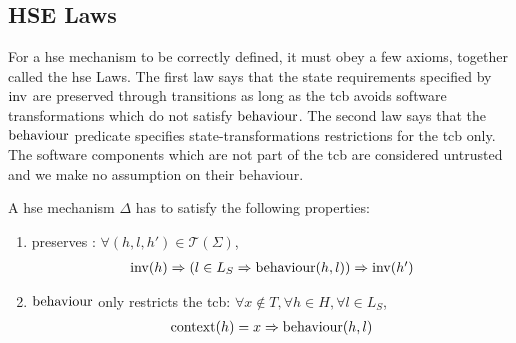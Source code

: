 \subsection{HSE Laws}
\label{subsec:speccert:laws}

For a \ac{hse} mechanism to be correctly defined, it must obey a few axioms,
together called the \ac{hse} Laws.
%
The first law says that the state requirements specified by $\mathrm{inv}$ are
preserved through transitions as long as the \ac{tcb} avoids software
transformations which do not satisfy $\mathrm{behaviour}$.
%
The second law says that the $\mathrm{behaviour}$ predicate specifies
state-transformations restrictions for the \ac{tcb} only.
%
The software components which are not part of the \ac{tcb} are considered
untrusted and we make no assumption on their behaviour.

\begin{definition}
  \label{def:laws}
  A \ac{hse} mechanism $\Delta$ has to satisfy the following properties:
  \begin{enumerate}
  \item {} preserves :
    $\forall (h, l, h') \in \mathcal{T}(\Sigma)$,
    \[
      \begin{array}{l} \mathrm{inv}(h) \Rightarrow (l \in L_S \Rightarrow
        \mathrm{behaviour}(h,l)) \Rightarrow \mathrm{inv}(h')
      \end{array}
    \]
  \item $\mathrm{behaviour}$ only restricts the \ac{tcb}:
    $\forall x \not\in T, \forall h \in H, \forall l \in L_S$,
    \[
      \begin{array}{l}
        \mathrm{context}(h) = x \Rightarrow \mathrm{behaviour}(h, l)
      \end{array}
    \]
  \end{enumerate}
\end{definition}

